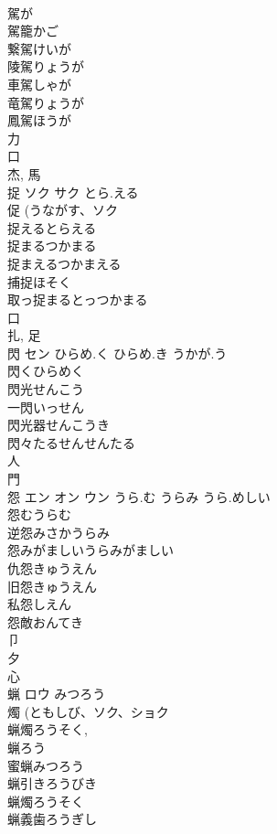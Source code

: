\documentclass[8pt]{extreport}
\begin{document}
\begin{CJK}{UTF8}{min}
\\	駕が 
\\	駕籠かご 
\\	繋駕けいが 
\\	陵駕りょうが 
\\	車駕しゃが 
\\	竜駕りょうが 
\\	鳳駕ほうが 
\\	力 
\\	口 
\\	杰, 馬 
\\	捉	ソク サク	とら.える	
\\	促 (うながす、ソク 
\\	捉えるとらえる 
\\	捉まるつかまる 
\\	捉まえるつかまえる 
\\	捕捉ほそく 
\\	取っ捉まるとっつかまる 
\\	口 
\\	扎, 足 
\\	閃	セン	ひらめ.く ひらめ.き うかが.う	
\\	閃くひらめく 
\\	閃光せんこう 
\\	一閃いっせん 
\\	閃光器せんこうき 
\\	閃々たるせんせんたる 
\\	人 
\\	門 
\\	怨	エン オン ウン	うら.む うらみ うら.めしい	
\\	怨むうらむ
\\	逆怨みさかうらみ
\\	怨みがましいうらみがましい
\\	仇怨きゅうえん
\\	旧怨きゅうえん
\\	私怨しえん
\\	怨敵おんてき
\\	卩 
\\	夕 
\\	心 
\\	蝋	ロウ	みつろう	
\\	燭 (ともしび、ソク、ショク 
\\	蝋燭ろうそく, 
\\	蝋ろう 
\\	蜜蝋みつろう 
\\	蝋引きろうびき 
\\	蝋燭ろうそく 
\\	蝋義歯ろうぎし 

\end{CJK}
\end{document}
